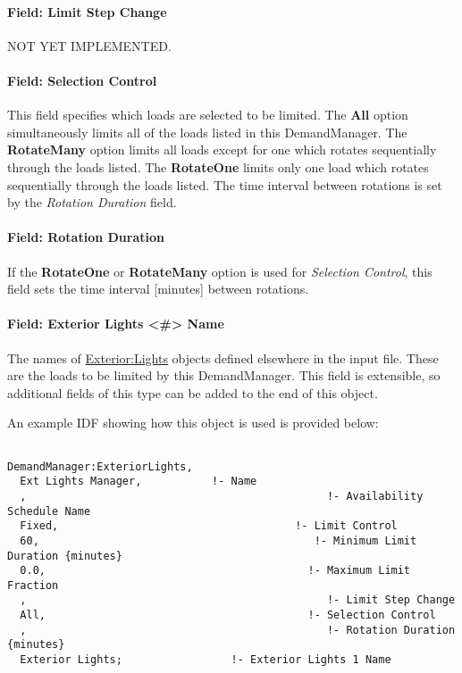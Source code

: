 \paragraph{Field: Limit Step Change}\label{field-limit-step-change}

NOT YET IMPLEMENTED.

\paragraph{Field: Selection Control}\label{field-selection-control}

This field specifies which loads are selected to be limited. The \textbf{All} option simultaneously limits all of the loads listed in this DemandManager. The \textbf{RotateMany} option limits all loads except for one which rotates sequentially through the loads listed. The \textbf{RotateOne} limits only one load which rotates sequentially through the loads listed. The time interval between rotations is set by the \emph{Rotation Duration} field.

\paragraph{Field: Rotation Duration}\label{field-rotation-duration}

If the \textbf{RotateOne} or \textbf{RotateMany} option is used for \emph{Selection Control}, this field sets the time interval {[}minutes{]} between rotations.

\paragraph{Field: Exterior Lights \textless{}\#\textgreater{} Name}\label{field-exterior-lights-1-10-name}

The names of \hyperref[exteriorlights]{Exterior:Lights} objects defined elsewhere in the input file. These are the loads to be limited by this DemandManager.  This field is extensible, so additional fields of this type can be added to the end of this object.

An example IDF showing how this object is used is provided below:

\begin{lstlisting}

DemandManager:ExteriorLights,
  Ext Lights Manager,           !- Name
  ,                                               !- Availability Schedule Name
  Fixed,                                     !- Limit Control
  60,                                           !- Minimum Limit Duration {minutes}
  0.0,                                         !- Maximum Limit Fraction
  ,                                               !- Limit Step Change
  All,                                         !- Selection Control
  ,                                               !- Rotation Duration {minutes}
  Exterior Lights;                 !- Exterior Lights 1 Name
\end{lstlisting}

